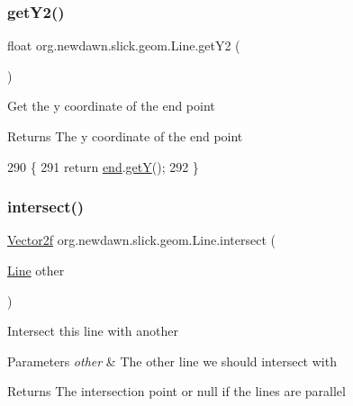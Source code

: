 \subsubsection{\texorpdfstring{get\+Y2()}{getY2()}}
{\footnotesize\ttfamily float org.\+newdawn.\+slick.\+geom.\+Line.\+get\+Y2 (\begin{DoxyParamCaption}{ }\end{DoxyParamCaption})\hspace{0.3cm}{\ttfamily [inline]}}

Get the y coordinate of the end point

\begin{DoxyReturn}{Returns}
The y coordinate of the end point 
\end{DoxyReturn}

\begin{DoxyCode}
290                          \{
291         \textcolor{keywordflow}{return} \mbox{\hyperlink{classorg_1_1newdawn_1_1slick_1_1geom_1_1_line_abc89f3da558e2d29ad48f3c453c25f92}{end}}.\mbox{\hyperlink{classorg_1_1newdawn_1_1slick_1_1geom_1_1_vector2f_aa26075f083c1ce0c8c87536bc008cc8c}{getY}}();
292     \}
\end{DoxyCode}
\mbox{\label{classorg_1_1newdawn_1_1slick_1_1geom_1_1_line_a9b75c7b1fea8dc4f0e2382205597335c}} 
\subsubsection{\texorpdfstring{intersect()}{intersect()}\hspace{0.1cm}{\footnotesize\ttfamily [1/3]}}
{\footnotesize\ttfamily \mbox{\hyperlink{classorg_1_1newdawn_1_1slick_1_1geom_1_1_vector2f}{Vector2f}} org.\+newdawn.\+slick.\+geom.\+Line.\+intersect (\begin{DoxyParamCaption}\item[{\mbox{\hyperlink{classorg_1_1newdawn_1_1slick_1_1geom_1_1_line}{Line}}}]{other }\end{DoxyParamCaption})\hspace{0.3cm}{\ttfamily [inline]}}

Intersect this line with another


\begin{DoxyParams}{Parameters}
{\em other} & The other line we should intersect with \\
\hline
\end{DoxyParams}
\begin{DoxyReturn}{Returns}
The intersection point or null if the lines are parallel 
\end{DoxyReturn}

